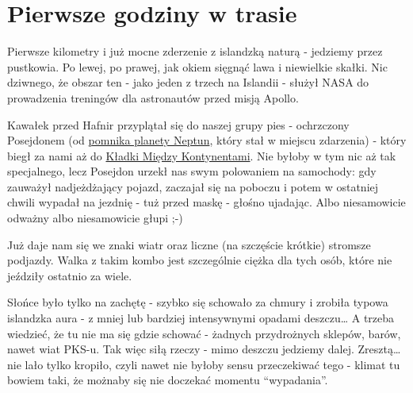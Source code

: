 \section{Pierwsze godziny w trasie}

Pierwsze kilometry i już mocne zderzenie z islandzką naturą - jedziemy przez pustkowia. Po lewej, po prawej, jak okiem sięgnąć lawa i niewielkie skałki. Nic dziwnego, że obszar ten - jako jeden z trzech na Islandii - służył NASA do prowadzenia treningów dla astronautów przed misją Apollo.



Kawałek przed Hafnir przyplątał się do naszej grupy pies - ochrzczony Posejdonem (od \href{https://www.facebook.com/120832791270880/photos/a.612815058739315.1073741825.120832791270880/612815132072641/?type=3&theater}{pomnika planety Neptun}, który stał w miejscu zdarzenia) - który biegł za nami aż do \href{http://www.visitreykjanes.is/searchresults/attraction/bridge-between-continents}{Kładki Między Kontynentami}. Nie byłoby w tym nic aż tak specjalnego, lecz Posejdon urzekł nas swym polowaniem na samochody: gdy zauważył nadjeżdżający pojazd, zaczajał się na poboczu i potem w ostatniej chwili wypadał na jezdnię - tuż przed maskę - głośno ujadając. Albo niesamowicie odważny albo niesamowicie głupi ;-)

Już daje nam się we znaki wiatr oraz liczne (na szczęście krótkie) stromsze podjazdy. Walka z takim kombo jest szczególnie ciężka dla tych osób, które nie jeździły ostatnio za wiele.


Słońce było tylko na zachętę - szybko się schowało za chmury i zrobiła typowa islandzka aura - z mniej lub bardziej intensywnymi opadami deszczu… A trzeba wiedzieć, że tu nie ma się gdzie schować - żadnych przydrożnych sklepów, barów, nawet wiat PKS-u. Tak więc siłą rzeczy - mimo deszczu jedziemy dalej. Zresztą… nie lało tylko kropiło, czyli nawet nie byłoby sensu przeczekiwać tego - klimat tu bowiem taki, że możnaby się nie doczekać momentu “wypadania”.

